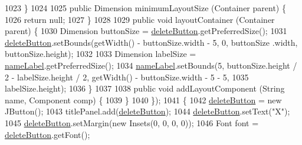 \begin{DoxyCode}
1023                     \}
1024 
1025                     \textcolor{keyword}{public} Dimension minimumLayoutSize (Container parent) \{
1026                         \textcolor{keywordflow}{return} null;
1027                     \}
1028 
1029                     \textcolor{keyword}{public} \textcolor{keywordtype}{void} layoutContainer (Container parent) \{
1030                         Dimension buttonSize = \mbox{\hyperlink{classorg_1_1newdawn_1_1slick_1_1tools_1_1hiero_1_1_hiero_1_1_effect_panel_af714c92441bfd930e38dfad0ea00457a}{deleteButton}}.getPreferredSize();
1031                         \mbox{\hyperlink{classorg_1_1newdawn_1_1slick_1_1tools_1_1hiero_1_1_hiero_1_1_effect_panel_af714c92441bfd930e38dfad0ea00457a}{deleteButton}}.setBounds(getWidth() - buttonSize.width - 5, 0, buttonSize
      .width, buttonSize.height);
1032 
1033                         Dimension labelSize = \mbox{\hyperlink{classorg_1_1newdawn_1_1slick_1_1tools_1_1hiero_1_1_hiero_1_1_effect_panel_ab7a1975493a3fa12a1636af0bdbd697a}{nameLabel}}.getPreferredSize();
1034                         \mbox{\hyperlink{classorg_1_1newdawn_1_1slick_1_1tools_1_1hiero_1_1_hiero_1_1_effect_panel_ab7a1975493a3fa12a1636af0bdbd697a}{nameLabel}}.setBounds(5, buttonSize.height / 2 - labelSize.height / 2, 
      getWidth() - buttonSize.width - 5 - 5,
1035                             labelSize.height);
1036                     \}
1037 
1038                     \textcolor{keyword}{public} \textcolor{keywordtype}{void} addLayoutComponent (String name, Component comp) \{
1039                     \}
1040                 \});
1041                 \{
1042                     \mbox{\hyperlink{classorg_1_1newdawn_1_1slick_1_1tools_1_1hiero_1_1_hiero_1_1_effect_panel_af714c92441bfd930e38dfad0ea00457a}{deleteButton}} = \textcolor{keyword}{new} JButton();
1043                     titlePanel.add(\mbox{\hyperlink{classorg_1_1newdawn_1_1slick_1_1tools_1_1hiero_1_1_hiero_1_1_effect_panel_af714c92441bfd930e38dfad0ea00457a}{deleteButton}});
1044                     \mbox{\hyperlink{classorg_1_1newdawn_1_1slick_1_1tools_1_1hiero_1_1_hiero_1_1_effect_panel_af714c92441bfd930e38dfad0ea00457a}{deleteButton}}.setText(\textcolor{stringliteral}{"X"});
1045                     \mbox{\hyperlink{classorg_1_1newdawn_1_1slick_1_1tools_1_1hiero_1_1_hiero_1_1_effect_panel_af714c92441bfd930e38dfad0ea00457a}{deleteButton}}.setMargin(\textcolor{keyword}{new} Insets(0, 0, 0, 0));
1046                     Font font = \mbox{\hyperlink{classorg_1_1newdawn_1_1slick_1_1tools_1_1hiero_1_1_hiero_1_1_effect_panel_af714c92441bfd930e38dfad0ea00457a}{deleteButton}}.getFont();

\end{DoxyCode}
